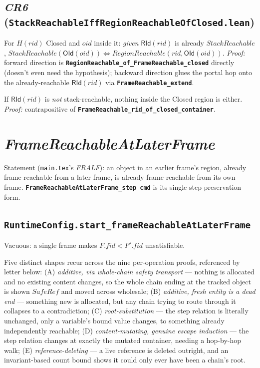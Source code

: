 \documentclass[11pt]{article}
\newcommand{\file}[1]{\texttt{#1}}
\newcommand{\thm}[1]{\textbf{\texttt{#1}}}
\begin{document}
\subsection{\textit{CR6} (\file{StackReachableIffRegionReachableOfClosed.lean})}

\begin{description}[nosep]
  \item[\thm{StackReachable\_iff\_RegionReachable\_of\_closed}] For $H(rid)$ Closed and $oid$
    inside it: \emph{given} $\mathsf{RId}(rid)$ is already $\mathit{StackReachable}$,
    $\mathit{StackReachable}(\mathsf{OId}(oid)) \iff \mathit{RegionReachable}(rid,\mathsf{OId}(oid))$.
    \emph{Proof:} forward direction is
    \thm{RegionReachable\_of\_FrameReachable\_closed} directly (doesn't even need the hypothesis);
    backward direction glues the portal hop onto the already-reachable $\mathsf{RId}(rid)$ via
    \thm{FrameReachable\_extend}.
  \item[\thm{not\_StackReachable\_rid\_implies\_not\_StackReachable\_objects\_of\_closed}] If
    $\mathsf{RId}(rid)$ is \emph{not} stack-reachable, nothing inside the Closed region is either.
    \emph{Proof:} contrapositive of \thm{FrameReachable\_rid\_of\_closed\_container}.
\end{description}

\section{\textit{FrameReachableAtLaterFrame}}

Statement (\file{main.tex}'s \textit{FRALF}): an object in an earlier frame's region, already
frame-reachable from a later frame, is already frame-reachable from its own frame.
\thm{FrameReachableAtLaterFrame\_step cmd} is its single-step-preservation form.

\subsection{\thm{RuntimeConfig.start\_frameReachableAtLaterFrame}}
Vacuous: a single frame makes $F.fid < F'.fid$ unsatisfiable.

Five distinct shapes recur across the nine per-operation proofs, referenced by letter below:
(A) \emph{additive, via whole-chain safety transport} --- nothing is allocated and no existing
content changes, so the whole chain ending at the tracked object is shown $\mathit{SafeRef}$ and
moved across wholesale; (B) \emph{additive, fresh entity is a dead end} --- something new is
allocated, but any chain trying to route through it collapses to a contradiction; (C)
\emph{root-substitution} --- the step relation is literally unchanged, only a variable's bound
value changes, to something already independently reachable; (D) \emph{content-mutating, genuine
escape induction} --- the step relation changes at exactly the mutated container, needing a
hop-by-hop walk; (E) \emph{reference-deleting} --- a live reference is deleted outright, and an
invariant-based count bound shows it could only ever have been a chain's root.
\end{document}
